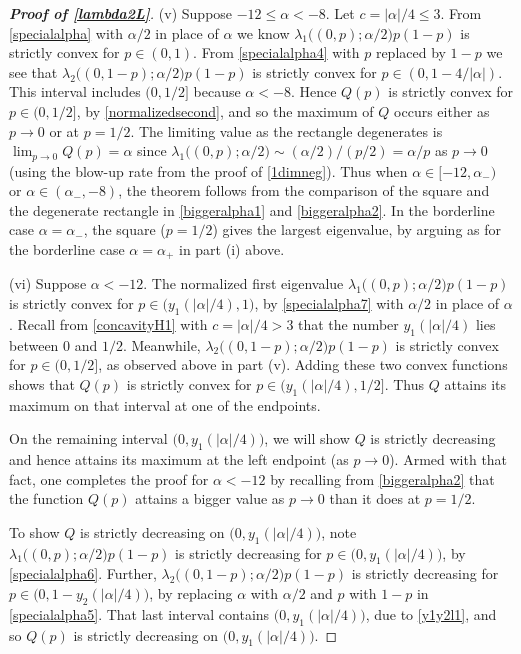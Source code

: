 \documentclass[12pt,reqno]{amsart}
\theoremstyle{definition}
\begin{document}
\begin{proof}[\bf Proof of \autoref{lambda2L}]
\smallskip
(v) Suppose $-12 \leq \alpha < -8$. Let $c=|\alpha|/4 \leq 3$. From \eqref{specialalpha} with $\alpha/2$ in place of $\alpha$ we know $\lambda_1\big( (0,p); \alpha/2\big) p(1-p)$ is strictly convex for $p \in (0,1)$. From \eqref{specialalpha4} with $p$ replaced by $1-p$ we see that $\lambda_2\big( (0,1-p); \alpha/2\big) p(1-p)$ is strictly convex for $p \in (0,1-4/|\alpha|)$. This interval includes $(0,1/2]$ because $\alpha < -8$. Hence $Q(p)$ is strictly convex for $p \in (0,1/2]$, by \eqref{normalizedsecond}, and so the maximum of $Q$ occurs either as $p \to 0$ or at $p=1/2$. The limiting value as the rectangle degenerates is $\lim_{p \to 0} Q(p) = \alpha$ since $\lambda_1\big( (0,p); \alpha/2\big) \sim (\alpha/2)/(p/2) = \alpha/p$ as $p \to 0$ (using the blow-up rate from the proof of \autoref{1dimneg}). Thus when $\alpha \in [-12,\alpha_-)$ or $\alpha \in (\alpha_-,-8)$, the theorem follows from the comparison of the square and the degenerate rectangle in \eqref{biggeralpha1} and \eqref{biggeralpha2}. In the borderline case $\alpha=\alpha_-$, the square ($p=1/2$) gives the largest eigenvalue, by arguing as for the borderline case $\alpha=\alpha_+$ in part (i) above.

\smallskip
(vi) Suppose $\alpha< -12$. The normalized first eigenvalue $\lambda_1\big( (0,p); \alpha/2\big) p(1-p)$ is strictly convex for $p \in \big(y_1(|\alpha|/4),1\big)$, by \eqref{specialalpha7} with $\alpha/2$ in place of $\alpha$. Recall from \autoref{concavityH1} with $c=|\alpha|/4>3$ that the number $y_1(|\alpha|/4)$ lies between $0$ and $1/2$. Meanwhile, $\lambda_2\big( (0,1-p); \alpha/2\big) p(1-p)$ is strictly convex for $p \in (0,1/2]$, as observed above in part (v). Adding these two convex functions shows that $Q(p)$ is strictly convex for $p \in \big(y_1(|\alpha|/4),1/2\big]$. Thus $Q$ attains its maximum on that interval at one of the endpoints. 

On the remaining interval $\big(0,y_1(|\alpha|/4)\big)$, we will show $Q$ is strictly decreasing and hence attains its maximum at the left endpoint (as $p \to 0$). Armed with that fact, one completes the proof for $\alpha<-12$ by recalling from \eqref{biggeralpha2} that the function $Q(p)$ attains a bigger value as $p \to 0$ than it does at $p=1/2$. 

To show $Q$ is strictly decreasing on $\big(0,y_1(|\alpha|/4)\big)$, note $\lambda_1\big( (0,p); \alpha/2\big) p(1-p)$ is strictly decreasing for $p \in \big(0,y_1(|\alpha|/4)\big)$, by \eqref{specialalpha6}. Further, $\lambda_2\big( (0,1-p); \alpha/2\big) p(1-p)$ is strictly decreasing for $p \in \big(0,1-y_2(|\alpha|/4)\big)$, by replacing $\alpha$ with $\alpha/2$ and $p$ with $1-p$ in \eqref{specialalpha5}. That last interval contains $\big(0,y_1(|\alpha|/4)\big)$, due to \eqref{y1y2l1}, and so $Q(p)$ is strictly decreasing on $\big(0,y_1(|\alpha|/4)\big)$. 
\end{proof}
\end{document}

